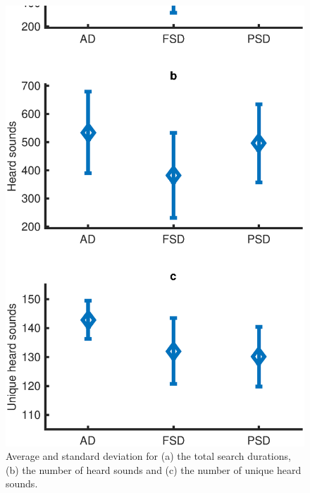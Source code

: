 \documentclass{aes2e}
\begin{document}
\begin{figure}[t]
\begin{center}
\includegraphics[scale=0.4]{gfx/analyse1.eps} 
\end{center}
\caption{\label{fig1} Average and standard deviation for (a) the total search durations, (b) the number of heard sounds and (c) the number of unique heard sounds.}
\end{figure}  
\end{document}

